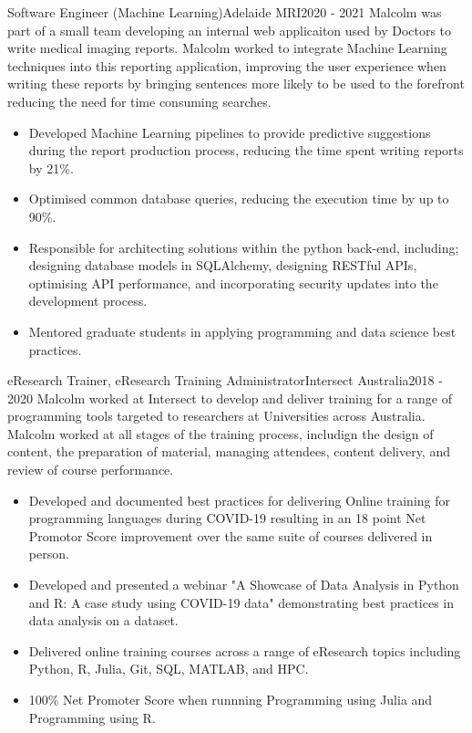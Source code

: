 \begin{cventry}{Software Engineer (Machine Learning)}{Adelaide MRI}{}{2020 - 2021}
  Malcolm was part of a small team developing an internal web applicaiton
  used by Doctors to write medical imaging reports.
  Malcolm worked to integrate Machine Learning techniques 
  into this reporting application,
  improving the user experience when writing these reports
  by bringing sentences more likely to be used to the forefront
  reducing the need for time consuming searches.
  \begin{itemize}
    \item Developed Machine Learning pipelines to provide predictive
      suggestions during the report production process, reducing the time spent
      writing reports by 21\%.
    \item Optimised common database queries, reducing the execution time by
      up to 90\%.
    \item Responsible for architecting solutions
      within the python back-end, including;
      designing database models in SQLAlchemy,
      designing RESTful APIs,
      optimising API performance,
      and incorporating security updates into the development process.
    \item Mentored graduate students in applying programming and data science
      best practices.
  \end{itemize}
\end{cventry}

\begin{cventry}{eResearch Trainer, eResearch Training Administrator}{Intersect Australia}{}{2018 - 2020}
  Malcolm worked at Intersect to develop and deliver training 
  for a range of programming tools
  targeted to researchers at Universities across Australia.
  Malcolm worked at all stages of the training process, 
  includign the design of content, 
  the preparation of material, managing attendees, 
  content delivery, and review of course performance.
  \begin{itemize}
    \item Developed and documented best practices for delivering Online
      training for programming languages during COVID-19 resulting in an
      18 point Net Promotor Score improvement over 
      the same suite of courses delivered in person.
    \item Developed and presented a webinar
      {"A Showcase of Data Analysis in Python and R: A case study using COVID-19 data"}
      demonstrating best practices in data analysis on a dataset.
    \item Delivered online training courses across a range of eResearch topics
      including Python, R, Julia, Git, SQL, MATLAB, and HPC.
    \item 100\% Net Promoter Score when runnning Programming using Julia and Programming using R.
  \end{itemize}
\end{cventry}


